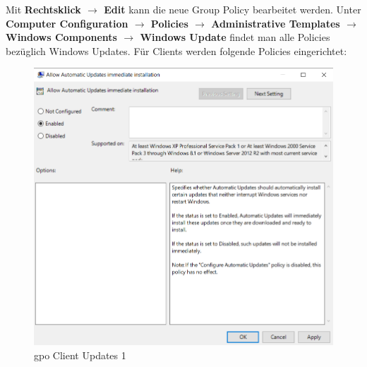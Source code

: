 Mit \textbf{Rechtsklick $\rightarrow$ Edit} kann die neue Group Policy bearbeitet werden.
Unter \textbf{Computer Configuration $\rightarrow$ Policies $\rightarrow$ Administrative Templates $\rightarrow$ Windows Components $\rightarrow$ Windows Update} findet man alle Policies bezüglich Windows Updates.
Für Clients werden folgende Policies eingerichtet:

\begin{minipage}{0.5\linewidth}
    \begin{figure}[H]
        \centering
        \includegraphics[width=\linewidth]{../img/Updates/client-allow-immediate-updates.png}
        \caption{\acrshort{gpo} Client Updates 1}
    \end{figure}
\end{minipage}
